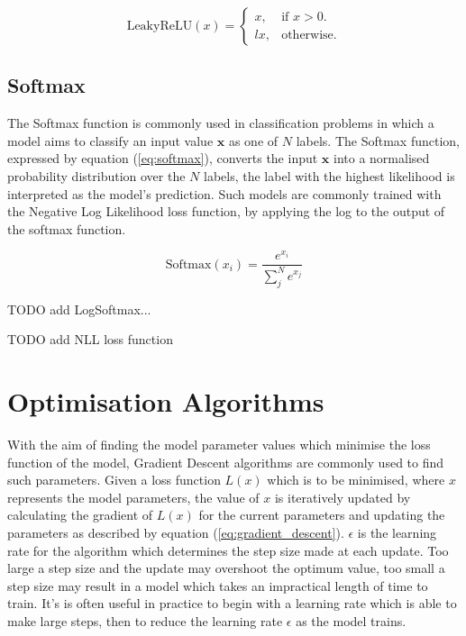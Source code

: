 \begin{equation}\label{eq:lrelu}
    \text{LeakyReLU}(x)=\begin{cases}
      x, & \text{if $x>0$}.\\
      lx, & \text{otherwise}.
    \end{cases}
\end{equation}

\subsection{Softmax} \label{softmax}
The Softmax function is commonly used in classification problems in which a model aims to classify an input value $\bm{x}$ as one of $N$ labels.
The Softmax function, expressed by equation (\ref{eq:softmax}), converts the input $\bm{x}$ into a normalised probability distribution over the $N$ labels, the label with the highest likelihood is interpreted as the model's prediction. 
Such models are commonly trained with the Negative Log Likelihood loss function, by applying the log to the output of the softmax function.

\begin{equation}\label{eq:softmax}
    \text{Softmax}(x_i) = \frac{e^{x_i}}{\sum_j^N e^{x_j}}
\end{equation}

TODO add LogSoftmax...

TODO add NLL loss function

\section{Optimisation Algorithms}
With the aim of finding the model parameter values which minimise the loss function of the model, Gradient Descent algorithms are commonly used to find such parameters.
Given a loss function $L(x)$ which is to be minimised, where $x$ represents the model parameters, the value of $x$ is iteratively updated by calculating the gradient of $L(x)$ for the current parameters and updating the parameters as described by equation (\ref{eq:gradient_descent}).
$\epsilon$ is the learning rate for the algorithm which determines the step size made at each update.
Too large a step size and the update may overshoot the optimum value, too small a step size may result in a model which takes an impractical length of time to train. 
It's is often useful in practice to begin with a learning rate which is able to make large steps, then to reduce the learning rate $\epsilon$ as the model trains.

